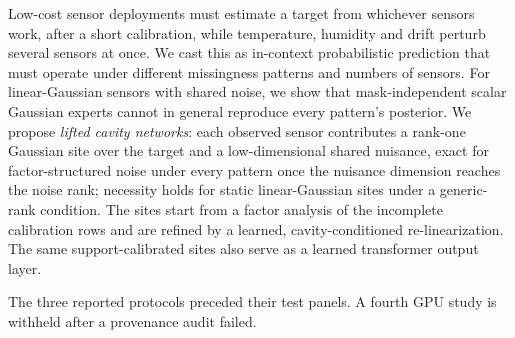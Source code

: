 Low-cost sensor deployments must estimate a target from whichever sensors work, after a short calibration, while
temperature, humidity and drift perturb several sensors at once. We cast this as in-context probabilistic prediction
that must operate under different missingness patterns and numbers of sensors. For linear-Gaussian sensors with shared
noise, we show that mask-independent scalar Gaussian experts cannot in general reproduce every pattern's posterior. We propose
\emph{lifted cavity networks}: each observed sensor contributes a rank-one Gaussian site over the target and a
low-dimensional shared nuisance, exact for factor-structured noise under every pattern once the nuisance dimension
reaches the noise rank; necessity holds for static linear-Gaussian sites under a generic-rank condition. The sites start from a factor analysis of the incomplete
calibration rows and are refined by a learned, cavity-conditioned re-linearization.
The same support-calibrated sites also serve as a learned transformer output layer.

The three reported protocols preceded their test panels. A fourth GPU study is withheld after a provenance audit failed.
